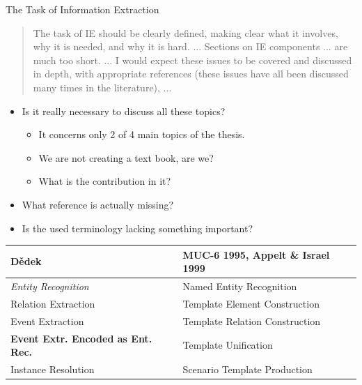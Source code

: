 \documentclass[xcolor=dvipsnames]{beamer}
\begin{document}
\begin{frame}{The Task of Information Extraction}
\begin{quotation}
\small The task of IE should be clearly defined, making clear what it involves, why it is needed, and why it is hard. ... Sections on IE components ... are much too short. ... I would expect these issues to be covered and discussed in depth, with appropriate references (these issues have all been discussed many times in the literature), ...
\end{quotation}

\begin{itemize}
	\item Is it really necessary to discuss all these topics?	
	\begin{itemize}
		\item It concerns only 2 of 4 main topics of the thesis.
		\item We are not creating a text book, are we?
		\item What is the contribution in it?
	\end{itemize}	
	\item What reference is actually missing?
	\item Is the used terminology lacking something important?
\end{itemize}
\begin{center}
	\begin{tabular}{l|l}
		Dědek & MUC-6 1995, Appelt \& Israel 1999\\
		\hline
		\emph{Entity Recognition} & Named Entity Recognition\\
		Relation Extraction & Template Element Construction\\
		Event Extraction & Template Relation Construction	\\
		\textbf{Event Extr. Encoded as Ent. Rec.} & Template Unification\\
		Instance Resolution & Scenario Template Production
	\end{tabular}
\end{center}
\end{frame}


\end{document}
